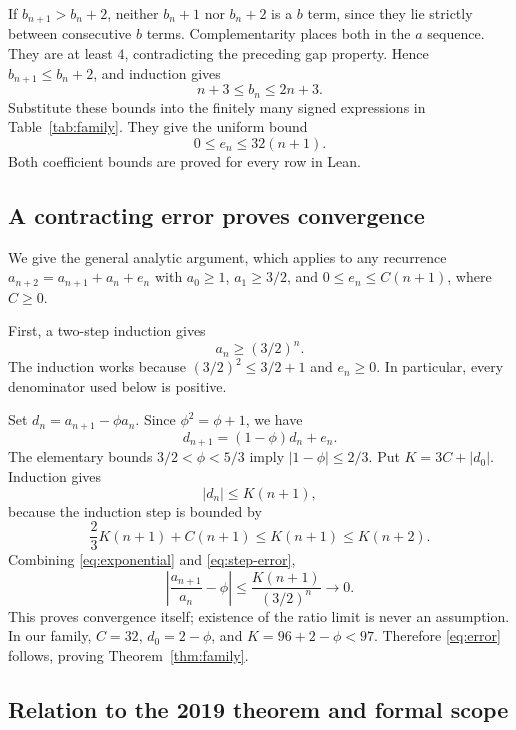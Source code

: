 \documentclass[11pt]{article}
\begin{document}
If $b_{n+1}>b_n+2$, neither $b_n+1$ nor $b_n+2$ is a $b$ term, since
they lie strictly between consecutive $b$ terms. Complementarity places
both in the $a$ sequence. They are at least $4$, contradicting the
preceding gap property. Hence $b_{n+1}\le b_n+2$, and induction gives
\begin{equation}
 n+3\le b_n\le2n+3.\label{eq:b-bounds}
\end{equation}
Substitute these bounds into the finitely many signed expressions in
Table~\ref{tab:family}. They give the uniform bound
\begin{equation}
 0\le e_n\le32(n+1).\label{eq:linear-force}
\end{equation}
Both coefficient bounds are proved for every row in Lean.

\subsection{A contracting error proves convergence}

We give the general analytic argument, which applies to any recurrence
$a_{n+2}=a_{n+1}+a_n+e_n$ with $a_0\ge1$, $a_1\ge3/2$, and
$0\le e_n\le C(n+1)$, where $C\ge0$.

First, a two-step induction gives
\begin{equation}
 a_n\ge(3/2)^n.\label{eq:exponential}
\end{equation}
The induction works because $(3/2)^2\le3/2+1$ and $e_n\ge0$.
In particular, every denominator used below is positive.

Set $d_n=a_{n+1}-\phi a_n$. Since $\phi^2=\phi+1$, we have
\[
 d_{n+1}=(1-\phi)d_n+e_n.
\]
The elementary bounds $3/2<\phi<5/3$ imply $|1-\phi|\le2/3$.
Put $K=3C+|d_0|$. Induction gives
\begin{equation}
 |d_n|\le K(n+1),\label{eq:step-error}
\end{equation}
because the induction step is bounded by
\[
 \frac23 K(n+1)+C(n+1)\le K(n+1)\le K(n+2).
\]
Combining \eqref{eq:exponential} and \eqref{eq:step-error},
\[
 \left|\frac{a_{n+1}}{a_n}-\phi\right|
 \le\frac{K(n+1)}{(3/2)^n}\longrightarrow0.
\]
This proves convergence itself; existence of the ratio limit is never an
assumption. In our family, $C=32$, $d_0=2-\phi$, and
$K=96+2-\phi<97$. Therefore \eqref{eq:error} follows, proving
Theorem~\ref{thm:family}.

\subsection{Relation to the 2019 theorem and formal scope}
\end{document}
